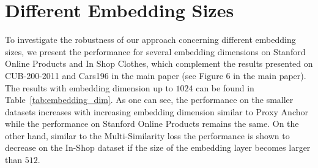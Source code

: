 \documentclass{article}
\begin{document}
\section{Different Embedding Sizes}
\label{sec:embeddings}
\begin{table*}[hbt!]
\centering
{}
\caption{Performance of our approach using different embedding sizes on CUB-200-2011, Cars196, Stanford Online Products and In-Shop Clothes datasets.}
\label{tab:embedding_dim}
\end{table*}


 
To investigate the robustness of our approach concerning different embedding sizes, we present the performance for several embedding dimensions on Stanford Online Products and In Shop Clothes, which complement the results presented on CUB-200-2011 and Cars196 in the main paper (see Figure 6 in the main paper). The results with embedding dimension up to $1024$ can be found in Table~\ref{tab:embedding_dim}. 
As one can see, the performance on the smaller datasets increases with increasing embedding dimension similar to Proxy Anchor \cite{DBLP:conf/cvpr/KimKCK20} while the performance on Stanford Online Products remains the same. On the other hand, similar to the Multi-Similarity loss \cite{DDBLP:conf/cvpr/Wand2019} the performance is shown to decrease on the In-Shop dataset if the size of the embedding layer becomes larger than $512$.
\end{document}
